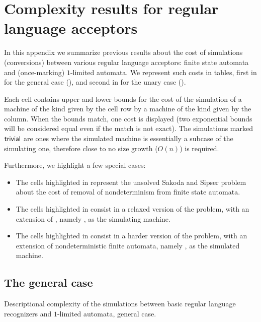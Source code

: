 \chapter{Complexity results for regular language acceptors}\label{app:results}
In this appendix we summarize previous results about the cost of simulations (conversions) between various regular language acceptors: finite state automata and (once-marking) $1$-limited automata.
We represent such costs in tables, first in  for the general case (), and second in  for the unary case ().

Each cell contains upper and lower bounds for the cost of the simulation of a machine of the kind given by the cell row by a machine of the kind given by the column.
When the bounds match, one cost is displayed (two exponential bounds will be considered equal even if the match is not exact).
The simulations marked~$\mathsf{trivial}$ are ones where the simulated machine is essentially a subcase of the simulating one, therefore close to no size growth ($O(n)$) is required.

Furthermore, we highlight a few special cases:
\begin{itemize}
	\item The cells highlighted in  represent the unsolved Sakoda and Sipser problem~\cite{SakSip78} about the cost of removal of nondeterminism from finite state automata.
	\item The cells highlighted in  consist in a relaxed version of the problem, with an extension of \TNFAs, namely \ODLAs, as the simulating machine.
	\item The cells highlighted in %
	      consist in a harder version of the problem, with an extension of nondeterministic finite automata, namely \OLAs, as the simulated machine.
\end{itemize}


\section{The general case}\label{sec:sims-general}

\begin{table}
	\centering
	\caption{Descriptional complexity of the simulations between basic regular language recognizers and $1$-limited automata, general case.}
	\label{tab:sims-1la-general}
\end{table}

